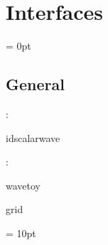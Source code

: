 
\section{Interfaces} 


\parskip = 0pt

\vspace{3mm} \subsection*{General}

: 

idscalarwave
\vspace{2mm}

: 

wavetoy

grid
\vspace{2mm}

\vspace{5mm}\parskip = 10pt 
